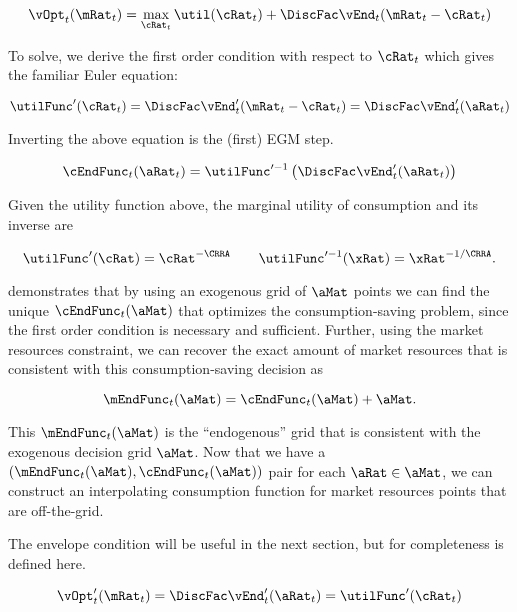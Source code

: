 \documentclass[\econtexRoot/SequentialEGM]{subfiles}
\begin{document}
\begin{equation}
    \vOpt_{t}(\mRat_{t}) = \max_{\cRat_{t}} \util(\cRat_{t}) +
    \DiscFac \vEnd_{t}(\mRat_{t}-\cRat_{t})
\end{equation}

To solve, we derive the first order condition with respect to $\cRat_{t}$ which gives the familiar Euler equation:

\begin{equation}
    \utilFunc'(\cRat_t) = \DiscFac \vEnd_{t}'(\mRat_{t} - \cRat_{t}) = \DiscFac
    \vEnd_{t}'(\aRat_{t})
\end{equation}

Inverting the above equation is the (first) EGM step.

\begin{equation}
    \cEndFunc_{t}(\aRat_{t}) = \utilFunc'^{-1}\left( \DiscFac \vEnd_{t}'(\aRat_{t})
    \right)
\end{equation}

Given the utility function above, the marginal utility of consumption and its inverse are

\begin{equation}
    \utilFunc'(\cRat) = \cRat^{-\CRRA} \qquad \utilFunc'^{-1}(\xRat) =
    \xRat^{-1/\CRRA}.
\end{equation}

\cite{Carroll2006-wq} demonstrates that by using an exogenous grid of $\aMat$ points we can find the unique
$\cEndFunc_{t}(\aMat)$ that optimizes the consumption-saving problem, since the first order condition is necessary and sufficient.
Further, using the market resources constraint, we can recover the exact amount
of market resources that is consistent with this consumption-saving decision as

\begin{equation}
    \mEndFunc_{t}(\aMat) = \cEndFunc_{t}(\aMat) + \aMat.
\end{equation}

This $\mEndFunc_{t}(\aMat)$ is the ``endogenous'' grid that is consistent
with the exogenous decision grid $\aMat$. Now that we have a
$(\mEndFunc_{t}(\aMat), \cEndFunc_{t}(\aMat))$ pair for each
$\aRat \in \aMat$, we can construct an interpolating consumption function for
market resources points that are off-the-grid.

The envelope condition will be useful in the next section, but for completeness
is defined here.

\begin{equation}
    \vOpt_{t}'(\mRat_{t}) = \DiscFac \vEnd_{t}'(\aRat_{t}) = \utilFunc'(\cRat_{t})
\end{equation}
\end{document}
